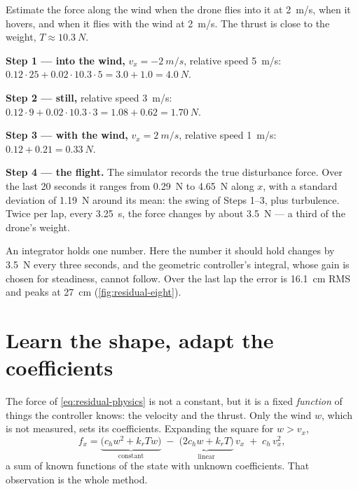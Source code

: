 \begin{example}
\label{ex:residual-range}
Estimate the force along the wind when the drone flies into it at \SI{2}{m/s}, when it hovers, and when it flies with the wind at \SI{2}{m/s}. The thrust is close to the weight, $T \approx \SI{10.3}{N}$.

\textbf{Step 1 — into the wind,} $v_x = \SI{-2}{m/s}$, relative speed \SI{5}{m/s}: $0.12 \cdot 25 + 0.02 \cdot 10.3 \cdot 5 = 3.0 + 1.0 = \SI{4.0}{N}$.

\textbf{Step 2 — still,} relative speed \SI{3}{m/s}: $0.12 \cdot 9 + 0.02 \cdot 10.3 \cdot 3 = 1.08 + 0.62 = \SI{1.70}{N}$.

\textbf{Step 3 — with the wind,} $v_x = \SI{+2}{m/s}$, relative speed \SI{1}{m/s}: $0.12 + 0.21 = \SI{0.33}{N}$.

\textbf{Step 4 — the flight.} The simulator records the true disturbance force. Over the last 20 seconds it ranges from \SI{0.29}{N} to \SI{4.65}{N} along $x$, with a standard deviation of \SI{1.19}{N} around its mean: the swing of Steps 1--3, plus turbulence. Twice per lap, every \SI{3.25}{s}, the force changes by about \SI{3.5}{N} — a third of the drone's weight.
\end{example}

An integrator holds one number. Here the number it should hold changes by \SI{3.5}{N} every three seconds, and the geometric controller's integral, whose gain is chosen for steadiness, cannot follow. Over the last lap the error is \SI{16.1}{cm} RMS and peaks at \SI{27}{cm} (\cref{fig:residual-eight}).

\section{Learn the shape, adapt the coefficients}

The force of \cref{eq:residual-physics} is not a constant, but it is a fixed \emph{function} of things the controller knows: the velocity and the thrust. Only the wind $w$, which is not measured, sets its coefficients. Expanding the square for $w > v_x$,
\begin{equation*}
  f_x = \underbrace{\big(c_hw^2 + k_rTw\big)}_{\text{constant}} \;-\; \underbrace{\big(2c_hw + k_rT\big)}_{\text{linear}}\,v_x \;+\; c_h\,v_x^2 ,
\end{equation*}
a sum of known functions of the state with unknown coefficients. That observation is the whole method.

